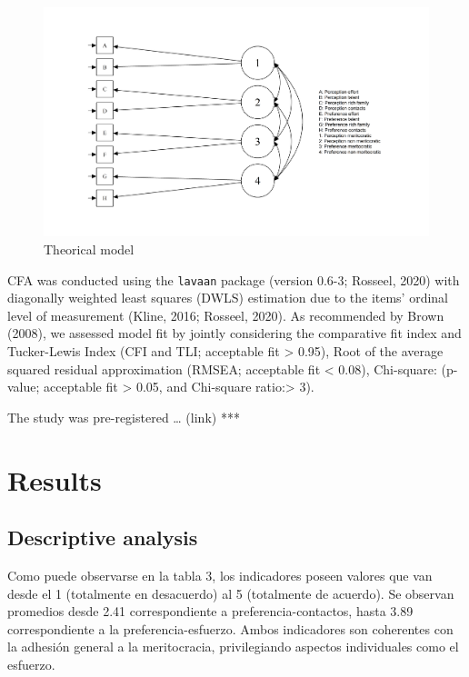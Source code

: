 \documentclass[
]{article}
\begin{document}
\begin{figure}
\centering
\includegraphics{../output/images/meas01.png}
\caption{Theorical model}
\end{figure}

CFA was conducted using the \texttt{lavaan} package (version 0.6-3;
Rosseel, 2020) with diagonally weighted least squares (DWLS) estimation
due to the items' ordinal level of measurement (Kline, 2016; Rosseel,
2020). As recommended by Brown (2008), we assessed model fit by jointly
considering the comparative fit index and Tucker-Lewis Index (CFI and
TLI; acceptable fit \textgreater{} 0.95), Root of the average squared
residual approximation (RMSEA; acceptable fit \textless{} 0.08),
Chi-square: (p-value; acceptable fit \textgreater{} 0.05, and Chi-square
ratio:\textgreater{} 3).

The study was pre-registered \ldots{} (link) ***

\hypertarget{results}{%
\section{Results}\label{results}}

\hypertarget{descriptive-analysis}{%
\subsection{Descriptive analysis}\label{descriptive-analysis}}

Como puede observarse en la tabla 3, los indicadores poseen valores que
van desde el 1 (totalmente en desacuerdo) al 5 (totalmente de acuerdo).
Se observan promedios desde 2.41 correspondiente a
preferencia-contactos, hasta 3.89 correspondiente a la
preferencia-esfuerzo. Ambos indicadores son coherentes con la adhesión
general a la meritocracia, privilegiando aspectos individuales como el
esfuerzo.
\end{document}
